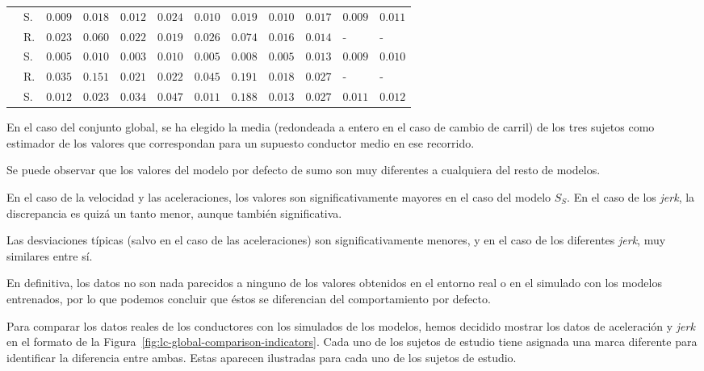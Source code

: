 \begin{table*}
\begin{tabularx}{\linewidth}{cYYYYYYYYYYY}
                                                                              & S. & $0.009$ & $0.018$ & $0.012$ & $0.024$ & $0.010$ & $0.019$ & $0.010$ & $0.017$ & $0.009$ & $0.011$ \\
		   & R. & $0.023$ & $0.060$ & $0.022$ & $0.019$ & $0.026$ & $0.074$ & $0.016$ & $0.014$ &  -      &  - \\
                                                                              & S. & $0.005$ & $0.010$ & $0.003$ & $0.010$ & $0.005$ & $0.008$ & $0.005$ & $0.013$ & $0.009$ & $0.010$ \\
		   & R. & $0.035$ & $0.151$ & $0.021$ & $0.022$ & $0.045$ & $0.191$ & $0.018$ & $0.027$ &  -      &  - \\
                                                                              & S. & $0.012$ & $0.023$ & $0.034$ & $0.047$ & $0.011$ & $0.188$ & $0.013$ & $0.027$ & $0.011$ & $0.012$ \\
		\bottomrule
	\end{tabularx}
\end{table*}

En el caso del conjunto global, se ha elegido la media (redondeada a entero en el caso de cambio de carril) de los tres sujetos como estimador de los valores que correspondan para un supuesto conductor medio en ese recorrido.

Se puede observar que los valores del modelo por defecto de \gls{sumo} son muy diferentes a cualquiera del resto de modelos.

En el caso de la velocidad y las aceleraciones, los valores son significativamente mayores en el caso del modelo $S_S$. En el caso de los \textit{jerk}, la discrepancia es quizá un tanto menor, aunque también significativa.

Las desviaciones típicas (salvo en el caso de las aceleraciones) son significativamente menores, y en el caso de los diferentes \textit{jerk}, muy similares entre sí.

En definitiva, los datos no son nada parecidos a ninguno de los valores obtenidos en el entorno real o en el simulado con los modelos entrenados, por lo que podemos concluir que éstos se diferencian del comportamiento por defecto.

Para comparar los datos reales de los conductores con los simulados de los modelos, hemos decidido mostrar los datos de aceleración y \textit{jerk} en el formato de la Figura~\ref{fig:lc-global-comparison-indicators}. Cada uno de los sujetos de estudio tiene asignada una marca diferente para identificar la diferencia entre ambas. Estas aparecen ilustradas para cada uno de los sujetos de estudio.

